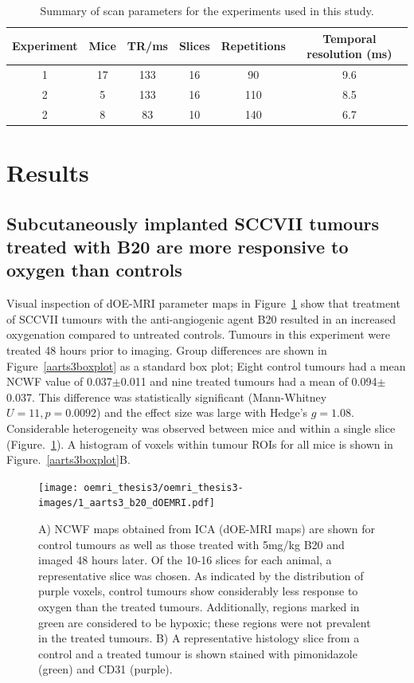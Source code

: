 \begin{table}[htbp]
\centering
\begin{tabular}{c|c|c|c|c|c}
Experiment & Mice & TR/ms & Slices & Repetitions & Temporal resolution (ms)\\
\hline
 1 & 17& 133 & 16 & 90  & 9.6  \\
 2 & 5 & 133 & 16 & 110 & 8.5  \\
 2 & 8 & 83  & 10 & 140 & 6.7 \\
\end{tabular}
\caption{Summary of scan parameters for the experiments used in this study.}
\label{scanparams}
\end{table}

\section{Results} 

\subsection{Subcutaneously implanted SCCVII tumours treated with B20 are more responsive to oxygen than controls}

Visual inspection of \ac{dOE-MRI} parameter maps in Figure~\ref{dOEMRImaps} show that treatment of SCCVII tumours with the anti-angiogenic agent B20 resulted in an increased oxygenation compared to untreated controls.
Tumours in this experiment were treated 48 hours prior to imaging.
Group differences are shown in Figure~\ref{aarts3boxplot} as a standard box plot; Eight control tumours had a mean \acs{NCWF} value of 0.037$\pm$0.011 and nine treated tumours had a mean of 0.094$\pm$0.037.
This difference was statistically significant (Mann-Whitney $U = 11 , p = 0.0092$) and the effect size was large with Hedge's ${g=1.08}$.
Considerable heterogeneity was observed between mice and within a single slice (Figure.~\ref{dOEMRImaps}).
A histogram of voxels within tumour \acs{ROI}s for all mice is shown in Figure.~\ref{aarts3boxplot}B.

\begin{figure}[htbp]
   \centering
   \texttt{[image: oemri\_thesis3/oemri\_thesis3-images/1\_aarts3\_b20\_dOEMRI.pdf]} %
   \caption{A) \acs{NCWF} maps obtained from \ac{ICA} (\ac{dOE-MRI} maps) are shown for control tumours as well as those treated with 5mg/kg B20 and imaged 48 hours later.
   Of the 10-16 slices for each animal, a representative slice was chosen.
   As indicated by the distribution of purple voxels, control tumours show considerably less response to oxygen than the treated tumours.
   Additionally, regions marked in green are considered to be hypoxic; these regions were not prevalent in the treated tumours.
   B) A representative histology slice from a control and a treated tumour is shown stained with pimonidazole (green) and CD31 (purple).}
   \label{dOEMRImaps}
\end{figure}

